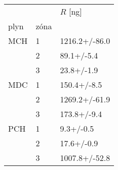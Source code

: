 \begin{tabular}{lll}
\toprule
    &   &       $R$ [ng] \\
plyn & zóna &                \\
\midrule
MCH & 1 &  1216.2+/-86.0 \\
    & 2 &     89.1+/-5.4 \\
    & 3 &     23.8+/-1.9 \\
MDC & 1 &    150.4+/-8.5 \\
    & 2 &  1269.2+/-61.9 \\
    & 3 &    173.8+/-9.4 \\
PCH & 1 &      9.3+/-0.5 \\
    & 2 &     17.6+/-0.9 \\
    & 3 &  1007.8+/-52.8 \\
\bottomrule
\end{tabular}

